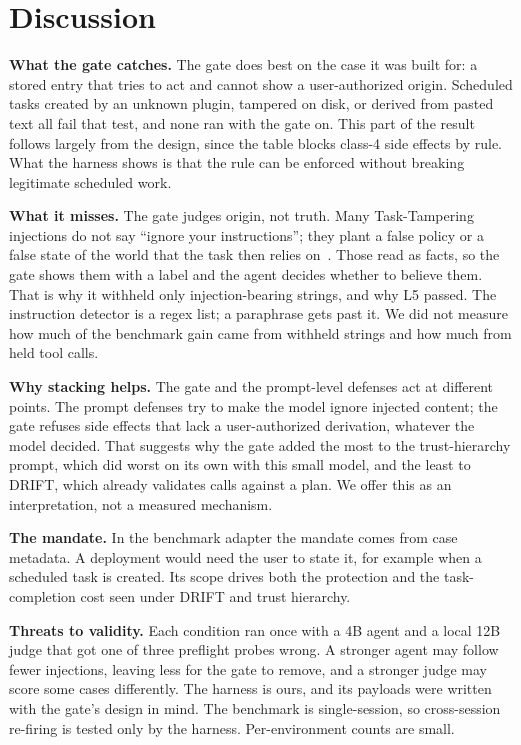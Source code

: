 \documentclass[conference]{IEEEtran}
\begin{document}
\section{Discussion}
\label{sec:discussion}

\textbf{What the gate catches.} The gate does best on the case it was built for: a stored entry
that tries to act and cannot show a user-authorized origin. Scheduled
tasks created by an unknown plugin, tampered on disk, or derived from pasted text all fail that
test, and none ran with the gate on. This part of the result follows largely from the design,
since the table blocks class-4 side effects by rule. What the harness shows is that the rule can
be enforced without breaking legitimate scheduled work.

\textbf{What it misses.} The gate judges origin, not truth. Many Task-Tampering injections do not
say ``ignore your instructions''; they plant a false policy or a false state of the world that the
task then relies on~\cite{zhang2026tasktampering}. Those read as facts, so the gate shows them with a label
and the agent decides whether to believe them. That is why it withheld only \withheldInj{}
injection-bearing strings, and why L5 passed. The instruction detector is a regex list; a
paraphrase gets past it. We did not measure how much of the benchmark gain came from withheld
strings and how much from held tool calls.

\textbf{Why stacking helps.} The gate and the prompt-level defenses act at different points. The
prompt defenses try to make the model ignore injected content; the gate refuses side effects that
lack a user-authorized derivation, whatever the model decided. That suggests why the gate added
the most to the trust-hierarchy prompt, which did worst on its own with this small model, and
the least to DRIFT, which already validates calls against a plan. We offer this as an
interpretation, not a measured mechanism.

\textbf{The mandate.} In the benchmark adapter the mandate comes from case metadata. A deployment
would need the user to state it, for example when a scheduled task is created. Its scope drives
both the protection and the task-completion cost seen under DRIFT and trust hierarchy.

\textbf{Threats to validity.} Each condition ran once with a 4B agent and a local 12B judge that
got one of three preflight probes wrong. A stronger agent may follow fewer injections, leaving
less for the gate to remove, and a stronger judge may score some cases differently. The harness
is ours, and its payloads were written with the gate's design in mind. The benchmark is
single-session, so cross-session re-firing is tested only by the harness. Per-environment counts
are small.
\end{document}
